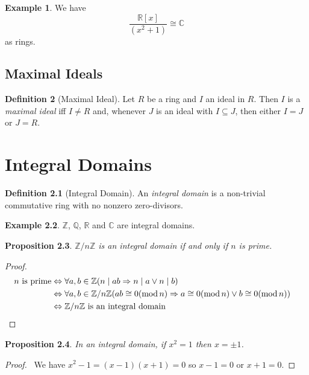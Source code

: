 \documentclass{book}
\let\qed\relax
\newtheorem{prop}{Proposition}[chapter]
\theoremstyle{definition}
\newtheorem{df}[prop]{Definition}
\newtheorem{ex}[prop]{Example}
\renewcommand{\mod}{\ensuremath{\operatorname{mod}}}
\begin{document}
\begin{ex}
We have
\[ \frac{\mathbb{R}[x]}{(x^2 + 1)} \cong \mathbb{C} \]
as rings.
\end{ex}

\section{Maximal Ideals}

\begin{df}[Maximal Ideal]
Let $R$ be a ring and $I$ an ideal in $R$. Then $I$ is a \emph{maximal ideal} iff $I \neq R$ and, whenever $J$ is an ideal with $I \subseteq J$, then either $I = J$ or $J = R$.
\end{df}

\chapter{Integral Domains}

\begin{df}[Integral Domain]
An \emph{integral domain} is a non-trivial commutative ring with no nonzero zero-divisors.
\end{df}

\begin{ex}
$\mathbb{Z}$, $\mathbb{Q}$, $\mathbb{R}$ and $\mathbb{C}$ are integral domains.
\end{ex}

\begin{prop}
$\mathbb{Z} / n \mathbb{Z}$ is an integral domain if and only if $n$ is prime.
\end{prop}

\begin{proof}
\pf
\begin{align*}
n \text{ is prime} & \Leftrightarrow \forall a,b \in \mathbb{Z} (n \mid a b \Rightarrow n \mid a \vee n \mid b) \\
& \Leftrightarrow \forall a,b \in \mathbb{Z} / n \mathbb{Z} (ab \cong 0 (\mod n) \Rightarrow a \cong 0 (\mod n) \vee b \cong 0 (\mod n)) \\
& \Leftrightarrow \mathbb{Z} / n \mathbb{Z} \text{ is an integral domain} & \qed
\end{align*}
\end{proof}

\begin{prop}
In an integral domain, if $x^2 = 1$ then $x = \pm 1$.
\end{prop}

\begin{proof}
\pf\ We have $x^2 - 1 = (x-1)(x+1) = 0$ so $x-1 = 0$ or $x+1 = 0$. \qed
\end{proof}
\end{document}
